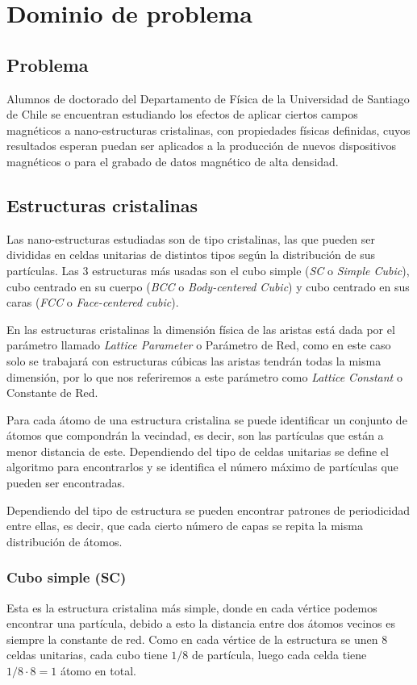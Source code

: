 \chapter{Dominio de problema}
\label{cap:dominio}

\section{Problema}
Alumnos de doctorado del Departamento de Física de la Universidad de Santiago de Chile se encuentran estudiando los efectos de aplicar ciertos campos magnéticos a nano-estructuras cristalinas, con propiedades físicas definidas, cuyos resultados esperan puedan ser aplicados a la producción de nuevos dispositivos magnéticos o para el grabado de datos magnético de alta densidad.

\section{Estructuras cristalinas}
Las nano-estructuras estudiadas son de tipo cristalinas, las que pueden ser divididas en celdas unitarias de distintos tipos  según la distribución de sus partículas. Las 3 estructuras más usadas son el cubo simple (\emph{SC} o \emph{Simple Cubic}), cubo centrado en su cuerpo (\emph{BCC} o \emph{Body-centered Cubic}) y cubo centrado en sus caras (\emph{FCC} o \emph{Face-centered cubic}).

En las estructuras cristalinas la dimensión física de las aristas está dada por el parámetro llamado \emph{Lattice Parameter} o Parámetro de Red, como en este caso solo se trabajará con estructuras cúbicas las aristas tendrán todas la misma dimensión, por lo que nos referiremos a este parámetro como \emph{Lattice Constant} o Constante de Red.

Para cada átomo de una estructura cristalina se puede identificar un conjunto de átomos que compondrán la vecindad, es decir, son las partículas que están a menor distancia de este. Dependiendo del tipo de celdas unitarias se define el algoritmo para encontrarlos y se identifica el número máximo de partículas que pueden ser encontradas.

Dependiendo del tipo de estructura se pueden encontrar patrones de periodicidad entre ellas, es decir, que cada cierto número de capas se repita la misma distribución de átomos.

\subsection{Cubo simple (SC)}
Esta es la estructura cristalina más simple, donde en cada vértice podemos encontrar una partícula, debido a esto la distancia entre dos átomos vecinos es siempre la constante de red. Como en cada vértice de la estructura se unen 8 celdas unitarias, cada cubo tiene $1/8$ de partícula, luego cada celda tiene $1/8 \cdot 8 = 1$ átomo en total.


